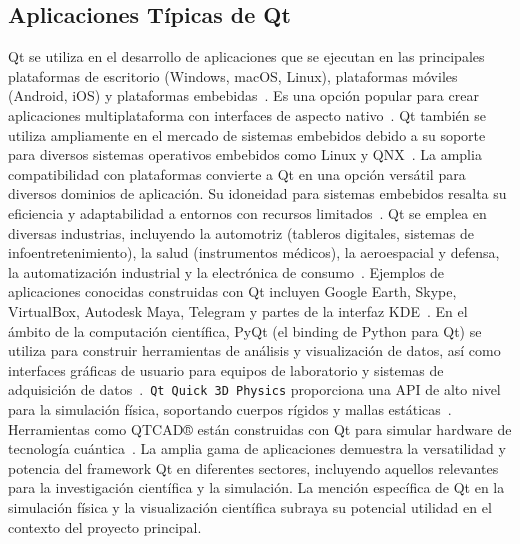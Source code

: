 \subsection{Aplicaciones Típicas de Qt}
Qt se utiliza en el desarrollo de aplicaciones que se ejecutan en las principales plataformas de escritorio (Windows, macOS, Linux), plataformas móviles (Android, iOS) y plataformas embebidas~\cite{qt_wiki}. Es una opción popular para crear aplicaciones multiplataforma con interfaces de aspecto nativo~\cite{qt_wiki}. Qt también se utiliza ampliamente en el mercado de sistemas embebidos debido a su soporte para diversos sistemas operativos embebidos como Linux y QNX~\cite{lemberg}. La amplia compatibilidad con plataformas convierte a Qt en una opción versátil para diversos dominios de aplicación. Su idoneidad para sistemas embebidos resalta su eficiencia y adaptabilidad a entornos con recursos limitados~\cite{qt_framework}.
Qt se emplea en diversas industrias, incluyendo la automotriz (tableros digitales, sistemas de infoentretenimiento), la salud (instrumentos médicos), la aeroespacial y defensa, la automatización industrial y la electrónica de consumo~\cite{lemberg}. Ejemplos de aplicaciones conocidas construidas con Qt incluyen Google Earth, Skype, VirtualBox, Autodesk Maya, Telegram y partes de la interfaz KDE~\cite{qt_use_cases}. En el ámbito de la computación científica, PyQt (el binding de Python para Qt) se utiliza para construir herramientas de análisis y visualización de datos, así como interfaces gráficas de usuario para equipos de laboratorio y sistemas de adquisición de datos~\cite{ontosight_pyqt_basics}.\ \texttt{Qt Quick 3D Physics} proporciona una API de alto nivel para la simulación física, soportando cuerpos rígidos y mallas estáticas~\cite{qt_quick}. Herramientas como QTCAD® están construidas con Qt para simular hardware de tecnología cuántica~\cite{ontosight_pyqt_basics}. La amplia gama de aplicaciones demuestra la versatilidad y potencia del framework Qt en diferentes sectores, incluyendo aquellos relevantes para la investigación científica y la simulación. La mención específica de Qt en la simulación física y la visualización científica subraya su potencial utilidad en el contexto del proyecto principal.

